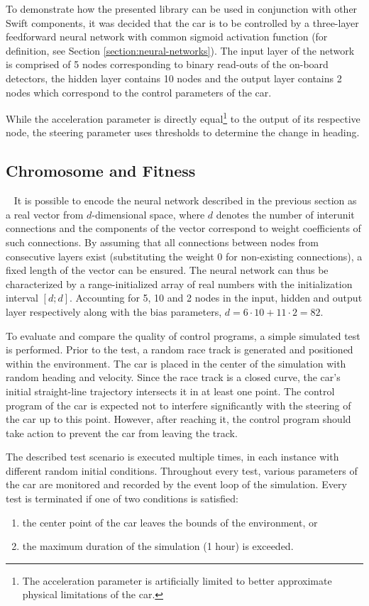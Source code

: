 To demonstrate how the presented library can be used in conjunction with other Swift components, it was decided that the car is to be controlled by a three-layer feedforward neural network with common sigmoid activation function (for definition, see Section \ref{section:neural-networks}). The input layer of the network is comprised of 5 nodes corresponding to binary read-outs of the on-board detectors, the hidden layer contains 10 nodes and the output layer contains 2 nodes which correspond to the control parameters of the car.

While the acceleration parameter is directly equal\footnote{The acceleration parameter is artificially limited to better approximate physical limitations of the car.} to the output of its respective node, the steering parameter uses thresholds to determine the change in heading.

\subsection{Chromosome and Fitness}~\label{section:car-chromosome}
It is possible to encode the neural network described in the previous section as a real vector from $d$-dimensional space, where $d$ denotes the number of interunit connections and the components of the vector correspond to weight coefficients of such connections. By assuming that all connections between nodes from consecutive layers exist (substituting the weight 0 for non-existing connections), a fixed length of the vector can be ensured. The neural network can thus be characterized by a range-initialized array of real numbers with the initialization interval $[d;d]$. Accounting for 5, 10 and 2 nodes in the input, hidden and output layer respectively along with the bias parameters, $d=6\cdot 10+11\cdot 2=82$.

To evaluate and compare the quality of control programs, a simple simulated test is performed. Prior to the test, a random race track is generated and positioned within the environment. The car is placed in the center of the simulation with random heading and velocity. Since the race track is a closed curve, the car's initial straight-line trajectory intersects it in at least one point. The control program of the car is expected not to interfere significantly with the steering of the car up to this point. However, after reaching it, the control program should take action to prevent the car from leaving the track.

The described test scenario is executed multiple times, in each instance with different random initial conditions. Throughout every test, various parameters of the car are monitored and recorded by the event loop of the simulation. Every test is terminated if one of two conditions is satisfied:
~
\begin{enumerate}
	\item the center point of the car leaves the bounds of the environment, or
	\item the maximum duration of the simulation (1 hour) is exceeded.
\end{enumerate}

